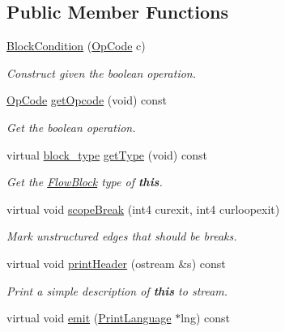\subsection*{Public Member Functions}
\begin{DoxyCompactItemize}
\item 
\mbox{\hyperlink{class_block_condition_ad36803efeb2af478d133c0ae2b6f7fdf}{Block\+Condition}} (\mbox{\hyperlink{opcodes_8hh_abeb7dfb0e9e2b3114e240a405d046ea7}{Op\+Code}} c)
\begin{DoxyCompactList}\small\item\em Construct given the boolean operation. \end{DoxyCompactList}\item 
\mbox{\hyperlink{opcodes_8hh_abeb7dfb0e9e2b3114e240a405d046ea7}{Op\+Code}} \mbox{\hyperlink{class_block_condition_a5dbdfcf9564708d69c63089919486db1}{get\+Opcode}} (void) const
\begin{DoxyCompactList}\small\item\em Get the boolean operation. \end{DoxyCompactList}\item 
virtual \mbox{\hyperlink{class_flow_block_a70df78390870fcdd51e31426ba6a193e}{block\+\_\+type}} \mbox{\hyperlink{class_block_condition_a654b72b19819b68c6f09e507dfee4ddd}{get\+Type}} (void) const
\begin{DoxyCompactList}\small\item\em Get the \mbox{\hyperlink{class_flow_block}{Flow\+Block}} type of {\bfseries{this}}. \end{DoxyCompactList}\item 
virtual void \mbox{\hyperlink{class_block_condition_ab25a80cf066d355146cd5b4a67d91f46}{scope\+Break}} (int4 curexit, int4 curloopexit)
\begin{DoxyCompactList}\small\item\em Mark unstructured edges that should be {\itshape breaks}. \end{DoxyCompactList}\item 
virtual void \mbox{\hyperlink{class_block_condition_a94ff21df098dda7c4cb50c87c500c439}{print\+Header}} (ostream \&s) const
\begin{DoxyCompactList}\small\item\em Print a simple description of {\bfseries{this}} to stream. \end{DoxyCompactList}\item 
virtual void \mbox{\hyperlink{class_block_condition_a952361756ea8b84dc0234d00d628c164}{emit}} (\mbox{\hyperlink{class_print_language}{Print\+Language}} $\ast$lng) const

\end{DoxyCompactItemize}

